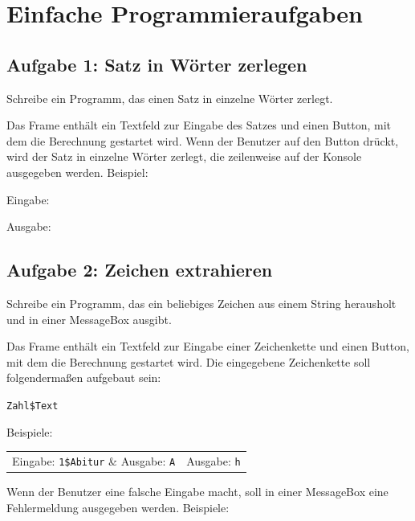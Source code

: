 \section{Einfache Programmieraufgaben}

\subsection{Aufgabe 1: Satz in Wörter zerlegen}

Schreibe ein Programm, das einen Satz in einzelne Wörter zerlegt. 

Das Frame enthält ein Textfeld zur Eingabe des Satzes und einen Button, mit dem
die Berechnung gestartet wird. Wenn der Benutzer auf den Button drückt, wird
der Satz in einzelne Wörter zerlegt, die zeilenweise auf der Konsole ausgegeben
werden. Beispiel:

Eingabe:


Ausgabe:

\linebreak
{}\linebreak
{}\linebreak 
{}\linebreak 
{}

\subsection{Aufgabe 2: Zeichen extrahieren}

Schreibe ein Programm, das ein beliebiges Zeichen aus einem String
herausholt und in einer MessageBox ausgibt.

Das Frame enthält ein Textfeld zur Eingabe einer Zeichenkette und einen Button,
mit dem die Berechnung gestartet wird. Die eingegebene Zeichenkette soll
folgendermaßen aufgebaut sein:

\lstinline|Zahl$Text|

Beispiele:

\bgroup
\def\arraystretch{1.2}
\begin{tabularx}{\textwidth}{p{50mm} X}
Eingabe: \lstinline|1$Abitur| &
Ausgabe: \lstinline|A| \\
Eingabe: \lstinline|12$Abiturvorschlag| &
Ausgabe: \lstinline|h| \\
\end{tabularx}
\egroup

Wenn der Benutzer eine falsche Eingabe macht, soll in einer MessageBox eine
Fehlermeldung ausgegeben werden. Beispiele:

